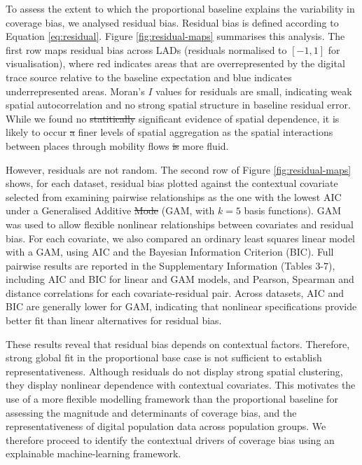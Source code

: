 \documentclass[]{rsos}%
\providecommand{\DIFadd}[1]{{\protect\color{blue}\uwave{#1}}} %
\providecommand{\DIFdel}[1]{{\protect\color{red}\sout{#1}}}                      %
\providecommand{\DIFaddbegin}{} %
\providecommand{\DIFaddend}{} %
\providecommand{\DIFdelbegin}{} %
\providecommand{\DIFdelend}{} %
\begin{document}
To assess the extent to which the proportional baseline explains the
variability in coverage bias, we analysed residual bias. Residual bias
is defined according to Equation \eqref{eq:residual}. Figure
\ref{fig:residual-maps} summarises this analysis. The first row maps
residual bias across LADs (residuals normalised to \([-1, 1]\) for
visualisation), where red indicates areas that are overrepresented by
the digital trace source relative to the baseline expectation and blue
indicates underrepresented areas. Moran's \(I\) values for residuals are
small, indicating weak spatial autocorrelation and no strong spatial
structure in baseline residual error. While we found no \DIFdelbegin \DIFdel{statitically }\DIFdelend \DIFaddbegin \DIFadd{statistically
}\DIFaddend significant evidence of spatial dependence, it is likely to occur \DIFdelbegin \DIFdel{a }\DIFdelend \DIFaddbegin \DIFadd{at }\DIFaddend finer levels of spatial aggregation as the spatial interactions between places through mobility flows \DIFdelbegin \DIFdel{is }\DIFdelend \DIFaddbegin \DIFadd{are }\DIFaddend more fluid.

However, residuals are not random. The second row of Figure
\ref{fig:residual-maps} shows, for each dataset, residual bias plotted
against the contextual covariate selected from examining pairwise
relationships as the one with the lowest AIC under a Generalised
Additive \DIFdelbegin \DIFdel{Mode }\DIFdelend \DIFaddbegin \DIFadd{Model }\DIFaddend (GAM, with \(k=5\) basis functions). GAM was used to allow
flexible nonlinear relationships between covariates and residual bias.
For each covariate, we also compared an ordinary least squares linear
model with a GAM, using AIC and the Bayesian Information Criterion
(BIC). Full pairwise results are reported in the Supplementary
Information (Tables 3-7), including AIC and BIC for linear and GAM
models, and Pearson, Spearman and distance correlations for each
covariate-residual pair. Across datasets, AIC and BIC are generally
lower for GAM, indicating that nonlinear specifications provide better
fit than linear alternatives for residual bias.

These results reveal that residual bias depends on contextual factors.
Therefore, strong global fit in the proportional base case is not
sufficient to establish representativeness. Although residuals do not
display strong spatial clustering, they display nonlinear dependence
with contextual covariates. This motivates the use of a more flexible
modelling framework than the proportional baseline for assessing the
magnitude and determinants of coverage bias, and the representativeness
of digital population data across population groups. We therefore
proceed to identify the contextual drivers of coverage bias using an
explainable machine-learning framework.
\end{document}
